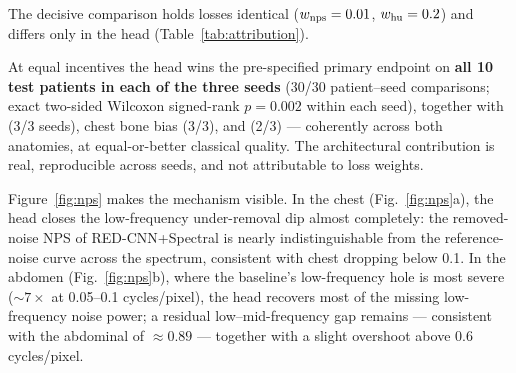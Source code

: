 The decisive comparison holds losses identical ($w_{\mathrm{nps}} = 0.01$, $w_{\mathrm{hu}} = 0.2$) and differs only in the head (Table~\ref{tab:attribution}).

\begin{table}[!tbp]
\centering
\caption{Matched-weight attribution control (mean $\pm$ std over seeds 0/1/2; SSIM/VIF from seed 0).}
\label{tab:attribution}
\setlength{\tabcolsep}{3pt}
\end{table}

At equal incentives the head wins the pre-specified primary endpoint on \textbf{all 10 test patients in each of the three seeds} (30/30 patient--seed comparisons; exact two-sided Wilcoxon signed-rank $p = 0.002$ within each seed), together with \stdr{} (3/3 seeds), chest bone bias (3/3), and \npsc{} (2/3) --- coherently across both anatomies, at equal-or-better classical quality. The architectural contribution is real, reproducible across seeds, and not attributable to loss weights.

Figure~\ref{fig:nps} makes the mechanism visible. In the chest (Fig.~\ref{fig:nps}a), the head closes the low-frequency under-removal dip almost completely: the removed-noise NPS of RED-CNN+Spectral is nearly indistinguishable from the reference-noise curve across the spectrum, consistent with chest \npsl{} dropping below 0.1. In the abdomen (Fig.~\ref{fig:nps}b), where the baseline's low-frequency hole is most severe (${\sim}7\times$ at 0.05--0.1 cycles/pixel), the head recovers most of the missing low-frequency noise power; a residual low--mid-frequency gap remains --- consistent with the abdominal \stdr{} of ${\approx}0.89$ --- together with a slight overshoot above 0.6 cycles/pixel.

